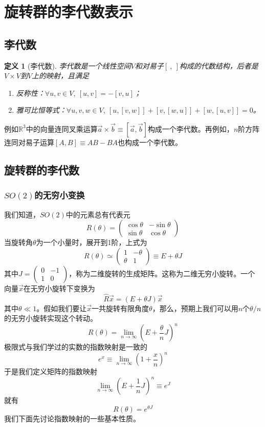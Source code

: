 \documentclass[a4paper,11pt]{ctexart}
\newcommand{\beq}{\begin{equation}}
\newcommand{\eeq}{\end{equation}}
\newcommand{\reals}{\mathbb{R}}
\newtheorem{dfn}{定义}[section]
\begin{document}
\section{旋转群的李代数表示}
\subsection{李代数}
\begin{dfn}[李代数]
李代数是一个线性空间$V$和对易子$[\ ,\ ]$构成的代数结构，后者是$V\times V$到$V$上的映射，且满足
\begin{enumerate}
\item 反称性：$\forall u,v \in V,\ [u,v] = -[v,u]$；
\item 雅可比恒等式：$\forall u,v,w \in V,\ [u,[v,w]] + [v,[w,u]] + [w,[u,v]] = 0$。
\end{enumerate}
\end{dfn}
例如$\reals^3$中的向量连同叉乘运算$\vec{a} \times \vec{b} \equiv [\vec{a},\vec{b}]$构成一个李代数。再例如，$n$阶方阵连同对易子运算$[A,B] \equiv AB - BA$也构成一个李代数。
\subsection{旋转群的李代数}
\subsubsection{$SO(2)$的无穷小变换}
我们知道，$SO(2)$中的元素总有代表元
\beq
R(\theta) = \begin{pmatrix}
\cos \theta & - \sin \theta \\
\sin \theta & \cos \theta
\end{pmatrix}
\eeq
当旋转角$\theta$为一个小量时，展开到1阶，上式为
\beq
R(\theta) \simeq \begin{pmatrix}
1 & - \theta \\
\theta & 1
\end{pmatrix}
\equiv E+ \theta J
\eeq
其中$J = \begin{pmatrix} 0 & - 1\\ 1 & 0 \end{pmatrix}$，称为二维旋转的生成矩阵。这称为二维无穷小旋转。一个向量$\vec{x}$在无穷小旋转下变换为
\beq
\hat{R} \vec{x} = (E + \theta J) \vec{x}
\eeq
其中$\theta \ll 1$。假如我们要让$\vec{x}$一共旋转有限角度$\theta$，那么，预期上我们可以用$n$个$\theta /n$的无穷小旋转实现这个转动。
\beq
R(\theta) = \lim_{n \to \infty} (E + \frac{\theta}{n} J)^n
\eeq
极限式与我们学过的实数的指数映射是一致的
\beq
e^x \equiv \lim_{n \to \infty} (1 + \frac{x}{n})^n
\eeq
于是我们定义矩阵的指数映射
\beq
\lim_{n \to \infty} (E + \frac{1}{n} J)^n \equiv e^{ J}
\eeq
就有
\beq
R(\theta) = e^{\theta J}
\eeq
我们下面先讨论指数映射的一些基本性质。
\end{document}

